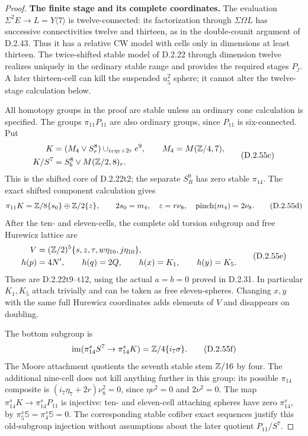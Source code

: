 \begin{proof}
\textbf{The finite stage and its complete coordinates.}
The evaluation $\Sigma^2E\to L=Y\langle7\rangle$ is
twelve-connected: its factorization through
$\Sigma\Omega L$ has successive connectivities twelve
and thirteen, as in the double-counit argument of D.2.43.
Thus it has a relative CW model with cells only in
dimensions at least thirteen.  The twice-shifted stable
model of D.2.22 through dimension twelve realizes
uniquely in the ordinary stable range and provides the
required stages $P_j$.  A later thirteen-cell can kill
the suspended $u_5^2$ sphere; it cannot alter the
twelve-stage calculation below.

All homotopy groups in the proof are stable unless an
ordinary cone calculation is specified.  The groups
$\pi_{11}P_{11}$ are also ordinary groups, since $P_{11}$
is six-connected.  Put
\[
 \begin{split}
 K&=(M_4\vee S^8_r)\cup_{i_7\eta_7+2r}e^9,
       \qquad M_4=M(\mathbb Z/4,7),\\
 K/S^7&=S^8_b\vee M(\mathbb Z/2,8)_r.
 \end{split}
 \tag{D.2.55c}
\]
This is the shifted core of D.2.22t2; the separate
$S^9_R$ has zero stable $\pi_{14}$.
The exact shifted component calculation gives
\[
 \pi_{11}K=\mathbb Z/8\{s_0\}\oplus\mathbb Z/2\{z\},\qquad
 2s_0=m_4,\quad z=r\nu_8,\quad
 \operatorname{pinch}(m_4)=2\nu_8.
 \tag{D.2.55d}
\]
After the ten- and eleven-cells, the complete old torsion
subgroup and free Hurewicz lattice are
\[
 \begin{split}
 V&=(\mathbb Z/2)^5\{s,z,\tau,w\eta_{10},j\eta_{10}\},\\
 h(p)&=4N',\qquad h(q)=2Q,\qquad
 h(x)=K_1,\qquad h(y)=K_5.
 \end{split}
 \tag{D.2.55e}
\]
These are D.2.22t9--t12, using the actual $a=b=0$
proved in D.2.31.  In particular $K_1,K_5$ attach
trivially and can be taken as free eleven-spheres.
Changing $x,y$ with the same full Hurewicz coordinates
adds elements of $V$ and disappears on doubling.

The bottom subgroup is
\[
 \operatorname{im}(\pi_{14}^sS^7\to\pi_{14}^sK)
                     =\mathbb Z/4\{i_7\sigma\}.
                     \tag{D.2.55f}
\]
The Moore attachment quotients the seventh stable stem
$\mathbb Z/16$ by four.  The additional nine-cell does not
kill anything further in this group: its possible
$\pi_{14}$ composite is
$(i_7\eta_7+2r)\nu_8^2=0$, since
$\eta\nu^2=0$ and $2\nu^2=0$.
The map $\pi_{14}^sK\to\pi_{14}^sP_{11}$ is injective:
ten- and eleven-cell attaching spheres have zero
$\pi_{14}^s$, by $\pi_5^s\mathbb S=\pi_4^s\mathbb S=0$.
The corresponding stable cofiber exact sequences justify
this old-subgroup injection without assumptions about
the later quotient $P_{11}/S^7$.


\end{proof}
